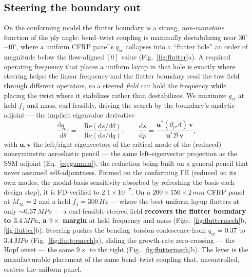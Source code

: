 \documentclass[11pt]{article}
\newcommand{\dd}{\mathrm{d}}
\begin{document}
\subsection{Steering the boundary out}
On the conforming model the flutter boundary is a strong, \emph{non-monotone} function of the ply
angle: bend--twist coupling is maximally destabilizing near $30^\circ$--$40^\circ$, where a uniform
CFRP panel's $q_{\mathrm{cr}}$ collapses into a ``flutter hole'' an order of magnitude below the
flow-aligned $[0]$ value (Fig.~\ref{fig:flutter}a). A required operating frequency that places a
uniform layup in that hole is exactly where steering helps: the linear frequency and the flutter
boundary read the tow field through different operators, so a steered \emph{field} can hold the
frequency while placing the twist where it stabilizes rather than destabilizes. We maximize
$q_{\mathrm{cr}}$ at held $f_1$ and mass, curl-feasibly, driving the search by the boundary's analytic
adjoint --- the implicit eigenvalue derivative
\begin{equation}
\frac{\dd q_{\mathrm{cr}}}{\dd\theta}=-\frac{\mathrm{Re}(\dd s/\dd\theta)}{\mathrm{Re}(\dd s/\dd q)},
\qquad
\frac{\dd s}{\dd p}=\frac{\bm u^{*}(\partial_p\bm{\mathcal A})\,\bm v}{\bm u^{*}\bm{\mathcal B}\,\bm v},
\label{eq:flutter-adj}
\end{equation}
with $\bm u,\bm v$ the left/right eigenvectors of the critical mode of the (reduced) nonsymmetric
aeroelastic pencil --- the same left-eigenvector projection as the SSM adjoint (Eq.~\eqref{eq:gamma}),
the reduction being built on a general pencil that never assumed self-adjointness. Formed on the
conforming FE (reduced on its own modes, the modal-basis sensitivity absorbed by refreshing the basis
each design step), it is FD-verified to $2.1\times10^{-7}$. On a $200\times150\times2\,\si{mm}$ CFRP
panel at $M_\infty=2$ and a held $f_1=300\,\si{Hz}$ --- where the best uniform layup flutters at only
$\sim\!0.37\,\si{MPa}$ --- a curl-feasible steered field \textbf{recovers the flutter boundary to
$3.4\,\si{MPa}$, a $9\times$ margin} at held frequency and mass
(Figs.~\ref{fig:fluttermech}b, \ref{fig:flutter}b). Steering pushes the bending--torsion coalescence
from $q_{\mathrm{cr}}=0.37$ to $3.4\,\si{MPa}$ (Fig.~\ref{fig:fluttermech}a), sliding the growth-rate
zero-crossing --- the Hopf onset --- the same $9\times$ to the right (Fig.~\ref{fig:fluttermech}b). The
lever is the manufacturable placement of the same bend--twist coupling that, uncontrolled, craters the
uniform panel.
\end{document}
